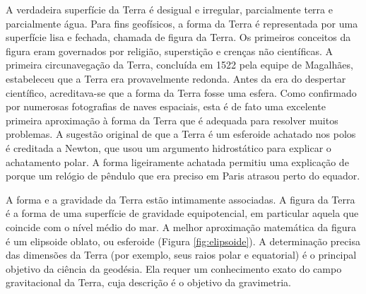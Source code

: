 \documentclass[]{book}
\theoremstyle{definition}
\theoremstyle{definition}
\theoremstyle{definition}
\theoremstyle{remark}
\begin{document}
A verdadeira superfície da Terra é desigual e irregular, parcialmente terra e parcialmente água. Para fins geofísicos, a forma da Terra é representada por uma superfície lisa e fechada, chamada de figura da Terra. Os primeiros conceitos da figura eram governados por religião, superstição e crenças não científicas. A primeira circunavegação da Terra, concluída em 1522 pela equipe de Magalhães, estabeleceu que a Terra era provavelmente redonda. Antes da era do despertar científico, acreditava-se que a forma da Terra fosse uma esfera. Como confirmado por numerosas fotografias de naves espaciais, esta é de fato uma excelente primeira aproximação à forma da Terra que é adequada para resolver muitos problemas. A sugestão original de que a Terra é um esferoide achatado nos polos é creditada a Newton, que usou um argumento hidrostático para explicar o achatamento polar. A forma ligeiramente achatada permitiu uma explicação de porque um relógio de pêndulo que era preciso em Paris atrasou perto do equador.

A forma e a gravidade da Terra estão intimamente associadas. A figura da Terra é a forma de uma superfície de gravidade equipotencial, em particular aquela que coincide com o nível médio do mar. A melhor aproximação matemática da figura é um elipsoide oblato, ou esferoide (Figura \ref{fig:elipsoide}). A determinação precisa das dimensões da Terra (por exemplo, seus raios polar e equatorial) é o principal objetivo da ciência da geodésia. Ela requer um conhecimento exato do campo gravitacional da Terra, cuja descrição é o objetivo da gravimetria.
\end{document}
